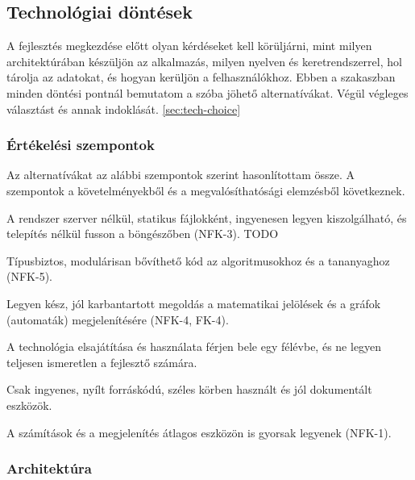 \subsection{Technológiai döntések}
\label{sec:tech}

A fejlesztés megkezdése előtt olyan kérdéseket kell körüljárni, mint
 milyen architektúrában
készüljön az alkalmazás, milyen nyelven és keretrendszerrel, hol
tárolja az adatokat, és hogyan kerüljön a felhasználókhoz. Ebben a
szakaszban minden döntési pontnál bemutatom a szóba jöhető
alternatívákat. Végül végleges választást és annak
indoklását. \ref{sec:tech-choice}

\subsubsection{Értékelési szempontok}

Az alternatívákat az alábbi szempontok szerint hasonlítottam össze.
A szempontok a követelményekből és a megvalósíthatósági elemzésből
következnek.

\begin{compactdesc}
    \item[Sz-1 (Üzemeltethetőség)] A rendszer szerver nélkül, statikus
          fájlokként, ingyenesen legyen kiszolgálható, és telepítés nélkül
          fusson a böngészőben (NFK-3). TODO
    \item[Sz-2 (Karbantarthatóság)] Típusbiztos, modulárisan bővíthető
          kód az algoritmusokhoz és a tananyaghoz (NFK-5).
    \item[Sz-3 (Ökoszisztéma)] Legyen kész, jól karbantartott megoldás
          a matematikai jelölések és a gráfok (automaták) megjelenítésére
          (NFK-4, FK-4).
    \item[Sz-4 (Komplexitás)] A technológia elsajátítása és használata
          férjen bele egy félévbe, és ne legyen teljesen ismeretlen
          a fejlesztő számára.
    \item[Sz-5 (Költség és nyíltság)] Csak ingyenes, nyílt forráskódú,
          széles körben használt és jól dokumentált eszközök.
    \item[Sz-6 (Teljesítmény)] A számítások és a megjelenítés átlagos
          eszközön is gyorsak legyenek (NFK-1).
\end{compactdesc}


\subsubsection{Architektúra}

